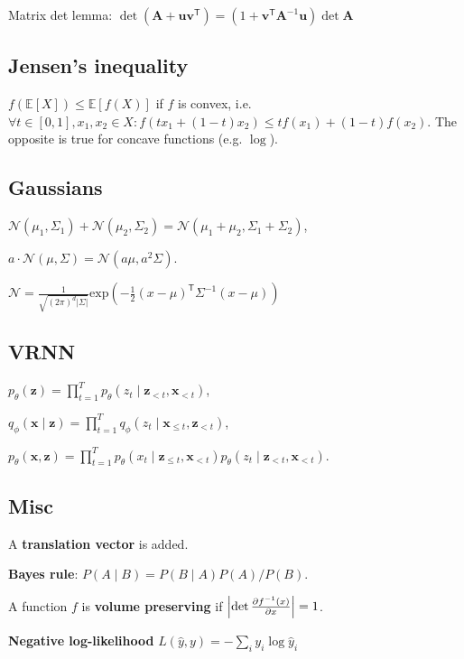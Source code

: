 \documentclass[11pt,landscape,a4paper,fleqn]{article}
\newcommand*{\tran}{^{\mathsf{T}}} %
\newcommand{\E}{\mathbb{E}}
\renewcommand{\exp}{\mathrm{exp}}
\def\myvector#1{\mathbf{#1}}
\def\vu{{\myvector{u}}}
\def\vv{{\myvector{v}}}
\def\vx{{\myvector{x}}}
\def\vz{{\myvector{z}}}
\def\mymatrix#1{\mathbf{#1}}
\def\mA{{\mymatrix{A}}}
\begin{document}
\begin{multicols*}{4}
Matrix det lemma: $\det(\mA + \vu\vv\tran) = (1 + \vv\tran \mA^{-1}\vu) \det \mA$

\subsection*{Jensen's inequality}
$f(\E[X]) \leq \E[f(X)]$ if $f$ is convex, i.e. $\forall t \in [0, 1], x_1, x_2 \in X : f(tx_1 + (1 - t)x_2) \leq tf(x_1) + (1 - t)f(x_2)$.
The opposite is true for concave functions (e.g. $\log$).


\subsection*{Gaussians}

$\mathcal{N}(\mu_1, \Sigma_1) + \mathcal{N}(\mu_2, \Sigma_2)
= \mathcal{N}(\mu_1 + \mu_2, \Sigma_1 + \Sigma_2)$,

$a \cdot \mathcal{N}(\mu, \Sigma) = \mathcal{N}(a\mu, a^2\Sigma)$.

$\mathcal{N} = \frac{1}{\sqrt{(2\pi)^d |\Sigma|}} \exp( - \frac{1}{2} (x - \mu)\tran \Sigma^{-1} (x - \mu))$

\subsection*{VRNN}

$p_\theta(\vz) = \prod_{t = 1}^T p_\theta(z_t \mid \vz_{ < t}, \vx_{ < t})$,

$q_\phi(\vx \mid \vz) = \prod_{t = 1}^T q_\phi(z_t \mid \vx_{ \leq t}, \vz_{ < t})$,

$p_\theta(\vx, \vz) = \prod_{t = 1}^T p_\theta(x_t \mid \vz_{ \leq t}, \vx_{ < t})p_\theta(z_t \mid \vz_{ < t}, \vx_{ < t})$.

\subsection*{Misc}
A \textbf{translation vector} is added.

\textbf{Bayes rule}:
$P(A \mid B) = P(B \mid A)P(A) / P(B)$.

A function $f$ is \textbf{volume preserving} if $\left|\det \pdv{f^{-1}(x)}{x}\right| = 1$.

\textbf{Negative log-likelihood} $L(\hat{y}, y) = - \sum_i y_i \log \hat{y}_i$

\end{multicols*}
\end{document}
